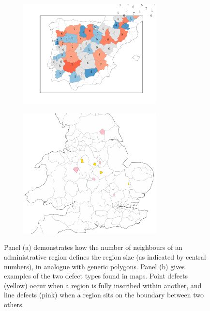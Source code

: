\begin{figure}[tb]
	\centering
     
          \begin{subfigure}[b]{0.48\textwidth}
         \centering
         \includegraphics[width=0.8\textwidth]{./appendices/figures/region_count.pdf}
         \caption{}
         \label{appfig:mapdefb}
     \end{subfigure}
     \hfill
      \begin{subfigure}[b]{0.48\textwidth}
         \centering
         \includegraphics[width=0.8\textwidth]{./appendices/figures/map_defects.pdf}
         \caption{}
         \label{appfig:mapdefa}
     \end{subfigure}
     \hfill

	\caption{Panel (a) demonstrates how the number of neighbours of an administrative region defines the region size (as indicated by central numbers), in analogue with generic polygons. Panel (b) gives examples of the two defect types found in maps. Point defects (yellow) occur when a region is fully inscribed within another, and line defects (pink) when a region sits on the boundary between two others.}
	\label{appfig:mapdefects}
\end{figure}

